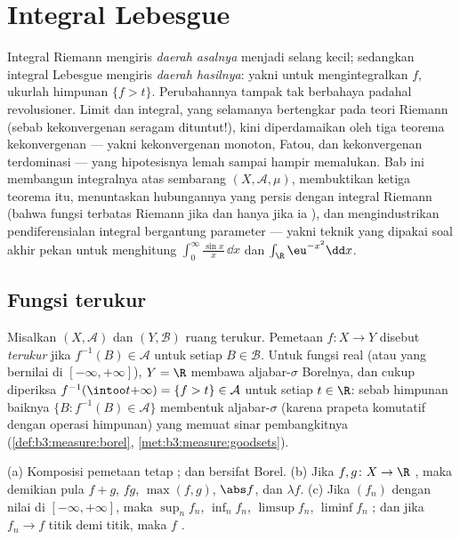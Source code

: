 \chapter{Integral Lebesgue}\label{ch:b3:lebesgue}

Integral Riemann mengiris \emph{daerah asalnya} menjadi selang
kecil; sedangkan integral Lebesgue mengiris \emph{daerah hasilnya}: yakni untuk mengintegralkan
$f$, ukurlah himpunan $\{f > t\}$. Perubahannya tampak tak berbahaya
padahal revolusioner. Limit dan integral, yang selamanya bertengkar
pada teori Riemann (sebab kekonvergenan seragam dituntut!), kini
diperdamaikan oleh tiga teorema kekonvergenan --- yakni kekonvergenan
monoton, Fatou, dan kekonvergenan terdominasi --- yang hipotesisnya
lemah sampai hampir memalukan. Bab ini membangun
integralnya atas sembarang  $(X, \mathcal A,
\mu)$, membuktikan ketiga teorema itu, menuntaskan hubungannya yang
persis dengan integral Riemann (bahwa fungsi terbatas
 Riemann jika dan hanya jika ia  ), dan
mengindustrikan pendiferensialan integral bergantung parameter
--- yakni teknik yang dipakai soal akhir pekan untuk
menghitung $\int_0^\infty\frac{\sin x}x\,\dd x$ dan
$\int_\R \eu^{-x^2}\dd x$.

\section{Fungsi terukur}

\begin{definition}\label{def:b3:lebesgue:measurable}
Misalkan $(X, \mathcal A)$ dan $(Y, \mathcal B)$ ruang terukur.
Pemetaan $f \colon X \to Y$ disebut \emph{terukur} jika $f^{-1}(B) \in \mathcal A$ untuk setiap $B \in
\mathcal B$. Untuk fungsi real (atau yang bernilai di
$[-\infty,+\infty]$), $Y = \R$ membawa aljabar-$\sigma$ Borelnya, dan
cukup diperiksa $f^{-1}(\intoo t{+\infty}) = \{f > t\} \in
\mathcal A$ untuk setiap $t \in \R$: sebab himpunan baiknya $\{B :
f^{-1}(B) \in \mathcal A\}$ membentuk aljabar-$\sigma$
(karena prapeta komutatif dengan operasi himpunan) yang memuat
sinar pembangkitnya (\cref{def:b3:measure:borel},
\cref{met:b3:measure:goodsets}).
\end{definition}

\begin{proposition}\label{prop:b3:lebesgue:stability}
(a) Komposisi pemetaan  tetap ; dan  bersifat  Borel.
(b) Jika $f, g \colon X \to \R$ , maka demikian pula $f + g$,
$fg$, $\max(f,g)$, $\abs f$, dan $\lambda f$.
(c) Jika $(f_n)$  dengan nilai di
$[-\infty, +\infty]$, maka $\sup_nf_n$, $\inf_nf_n$,
$\limsup f_n$, $\liminf f_n$ ; dan jika $f_n \to f$
titik demi titik, maka $f$ .
\end{proposition}

